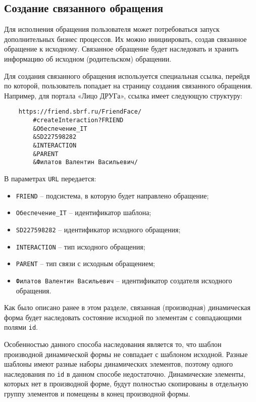 \documentclass[../index.tex]{subfiles}
\begin{document}
\subsection{Создание связанного обращения}
Для исполнения обращения пользователя может потребоваться запуск дополнительных бизнес процессов.
Их можно инициировать, создав связанное обращение к исходному.
Связанное обращение будет наследовать и хранить информацию об исходном (родительском) обращении.


Для создания связанного обращения используется специальная ссылка, перейдя по которой,
пользователь попадает на страницу создания связанного обращения.
Например, для портала «Лицо ДРУГа», ссылка имеет следующую структуру:


\begin{verbatim}
    https://friend.sbrf.ru/FriendFace/
        #createInteraction?FRIEND
        &Обеспечение_IT
        &SD227598282
        &INTERACTION
        &PARENT
        &Филатов Валентин Васильевич/
\end{verbatim}


В параметрах \verb|URL| передается:
\begin{itemize}
    \item \verb|FRIEND| – подсистема, в которую будет направлено обращение;
    \item \verb|Обеспечение_IT| – идентификатор шаблона;
    \item \verb|SD227598282| – идентификатор исходного обращения;
    \item \verb|INTERACTION| – тип исходного обращения;
    \item \verb|PARENT| – тип связи с исходным обращением;
    \item \verb|Филатов Валентин Васильевич| – идентификатор создателя исходного обращения.
\end{itemize}


Как было описано ранее в этом разделе, связанная (производная) динамическая форма
будет наследовать состояние исходной по элементам с совпадающими полями \verb|id|.


Особенностью данного способа наследования является то,
что шаблон производной динамической формы не совпадает с шаблоном исходной.
Разные шаблоны имеют разные наборы динамических элементов,
поэтому одного наследования по \verb|id| в данном способе недостаточно.
Динамические элементы, которых нет в производной форме,
будут полностью скопированы в отдельную группу элементов и помещены в конец производной формы.
\end{document}
